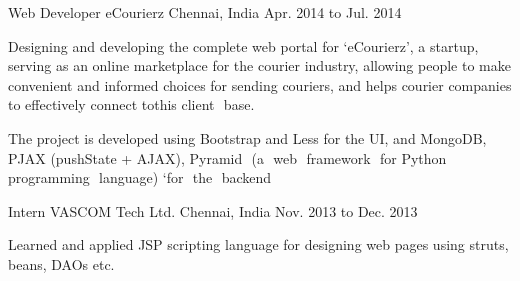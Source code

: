 \begin{cventries}
  \cventry
    {Web Developer} %
    {eCourierz} %
    {Chennai, India} %
    {Apr. 2014 to Jul. 2014} %
    {
      \begin{cvitems}
      \item{Designing and developing the complete web portal for ‘eCourierz’, a startup, serving as an online marketplace for the courier industry, allowing people to make convenient and informed choices for sending couriers, and helps courier​ ​companies to​ ​effectively​ connect​ ​to​ ​this client​ ​ base.}
      \item{The project is developed using Bootstrap and Less for the UI, and MongoDB, PJAX (pushState + AJAX), Pyramid​ ​ (a​ ​ web​ ​ framework​ ​ for​ ​ Python​ ​ programming​ ​ language)​ ​`for​ ​ the​ ​ backend}
      \end{cvitems}
    }

  \cventry
    {Intern} %
    {VASCOM Tech Ltd.} %
    {Chennai, India} %
    {Nov. 2013 to Dec. 2013} %
    {
      \begin{cvitems}
        \item{Learned and applied JSP scripting language for designing web pages using struts, beans, DAOs etc.}
      \end{cvitems}
    }


\end{cventries}
